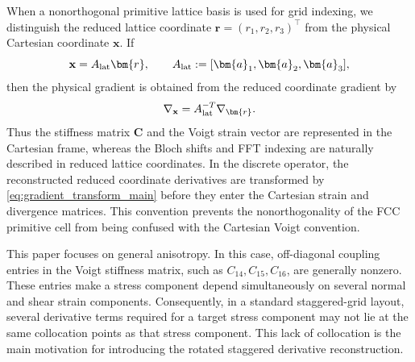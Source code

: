 \documentclass[11pt,oneside]{article}
\numberwithin{equation}{section}
\theoremstyle{plain}
\theoremstyle{remark}
\newcommand{\br}{\bm{r}}
\newcommand{\ba}[1]{\bm{a}_{#1}}
\begin{document}
When a nonorthogonal primitive lattice basis is used for grid indexing, we distinguish the reduced lattice coordinate \(\br=(r_1,r_2,r_3)^\top\) from the physical Cartesian coordinate \(\mathbf x\). If
\begin{equation}\label{eq:coordinate_map_main}
\mathbf x=A_{\rm lat}\br,
\qquad
A_{\rm lat}:=[\ba{1},\ba{2},\ba{3}],
\end{equation}
then the physical gradient is obtained from the reduced coordinate gradient by
\begin{equation}\label{eq:gradient_transform_main}
\nabla_{\mathbf x}=A_{\rm lat}^{-T}\nabla_{\br}.
\end{equation}
Thus the stiffness matrix \(\bm C\) and the Voigt strain vector are represented in the Cartesian frame, whereas the Bloch shifts and FFT indexing are naturally described in reduced lattice coordinates. In the discrete operator, the reconstructed reduced coordinate derivatives are transformed by \eqref{eq:gradient_transform_main} before they enter the Cartesian strain and divergence matrices. This convention prevents the nonorthogonality of the FCC primitive cell from being confused with the Cartesian Voigt convention.

This paper focuses on general anisotropy. In this case, off-diagonal coupling entries in the Voigt stiffness matrix, such as \(C_{14},C_{15},C_{16}\), are generally nonzero. These entries make a stress component depend simultaneously on several normal and shear strain components. Consequently, in a standard staggered-grid layout, several derivative terms required for a target stress component may not lie at the same collocation points as that stress component. This lack of collocation is the main motivation for introducing the rotated staggered derivative reconstruction.
\end{document}
